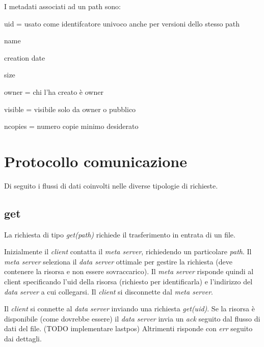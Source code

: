 \documentclass{article}
\begin{document}
I metadati associati ad un path sono: 

uid = usato come identifcatore univoco anche per versioni dello stesso path

name

creation date

size

owner = chi l'ha creato è owner

visible = visibile solo da owner o pubblico

ncopies = numero copie minimo desiderato


\section{Protocollo comunicazione}

Di seguito i flussi di dati coinvolti nelle diverse tipologie di richieste.

\subsection{get}

La richiesta di tipo \textit{get(path)} richiede il trasferimento in entrata di un file. 

Inizialmente il \textit{client} contatta il \textit{meta server}, richiedendo un particolare \textit{path}. Il \textit{meta server} seleziona il \textit{data server} ottimale per gestire la richiesta (deve contenere la risorsa e non essere sovraccarico). Il \textit{meta server} risponde quindi al client specificando l'uid della risorsa (richiesto per identificarla) e l'indirizzo del \textit{data server} a cui collegarsi. Il \textit{client} si disconnette dal \textit{meta server}.

Il \textit{client} si connette al \textit{data server} inviando una richiesta \textit{get(uid)}. Se la risorsa è disponibile (come dovrebbe essere) il \textit{data server} invia un \textit{ack} seguito dal flusso di dati del file. (TODO implementare lastpos) Altrimenti risponde con \textit{err} seguito dai dettagli. 
\end{document}
